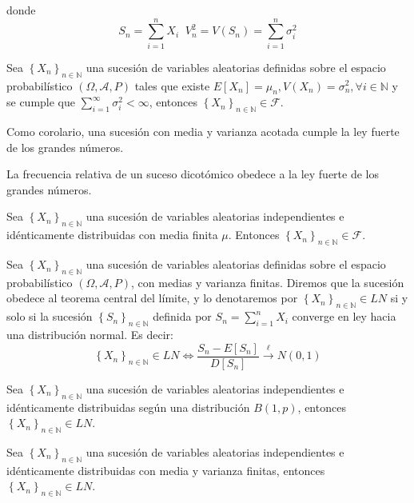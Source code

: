 donde
\begin{equation*}
S_n=\sum_{i=1}^nX_i\;\;V_n^2=V(S_n)=\sum_{i=1}^n\sigma_i^2
\end{equation*}

\begin{teorema}[Kolmogorov]
Sea $ \left\{X_n\right\}_{n\in\mathbb{N}}$ una sucesi\'on de variables aleatorias definidas sobre el espacio probabil\'istico $\left(\Omega,\mathcal{A}, P\right) $ tales que existe $E[X_n]=\mu_n, V(X_n)=\sigma_n^2,\forall i \in\mathbb{N}$ y se cumple que $\sum_{i=1}^{\infty}\sigma^2_i<\infty$, entonces $ \left\{X_n\right\}_{n\in\mathbb{N}}\in\mathscr{F}$.
\end{teorema}

Como corolario, una sucesi\'on con media y varianza acotada cumple la ley fuerte de los grandes n\'umeros.
\begin{teorema}
La frecuencia relativa de un suceso dicot\'omico obedece a la ley fuerte de los grandes n\'umeros.
\end{teorema}

\begin{teorema}[Khintchine]
Sea $ \left\{X_n\right\}_{n\in\mathbb{N}}$ una sucesi\'on de variables aleatorias independientes e id\'enticamente distribuidas con media finita $\mu$. Entonces $\left\{X_n\right\}_{n\in\mathbb{N}}\in\mathscr{F}$.
\end{teorema}




\begin{definicion}
Sea $ \left\{X_n\right\}_{n\in\mathbb{N}}$ una sucesi\'on de variables aleatorias definidas sobre el espacio probabil\'istico $\left(\Omega,\mathcal{A}, P\right) $, con medias y varianza finitas. Diremos que la sucesi\'on obedece al teorema central del l\'imite, y lo denotaremos por $\left\{X_n\right\}_{n\in\mathbb{N}}\in LN$ si y solo si la sucesi\'on $\left\{S_n\right\}_{n\in\mathbb{N}}$ definida por $S_n=\sum_{i=1}^nX_i$ converge en ley hacia una distribuci\'on normal. Es decir:
\begin{equation*}
\left\{X_n\right\}_{n\in\mathbb{N}}\in LN\Leftrightarrow \dfrac{S_n-E[S_n]}{D[S_n]}\overset{\ell}{\to}N(0,1)
\end{equation*}
\end{definicion}

\begin{teorema}[De Moivre]
Sea $ \left\{X_n\right\}_{n\in\mathbb{N}}$ una sucesi\'on de variables aleatorias independientes e id\'enticamente distribuidas seg\'un una distribuci\'on $B(1,p)$, entonces $\left\{X_n\right\}_{n\in\mathbb{N}}\in LN $.
\end{teorema}
\begin{teorema}
Sea $ \left\{X_n\right\}_{n\in\mathbb{N}}$ una sucesi\'on de variables aleatorias independientes e id\'enticamente distribuidas con media y varianza finitas, entonces $\left\{X_n\right\}_{n\in\mathbb{N}}\in LN $.
\end{teorema}
